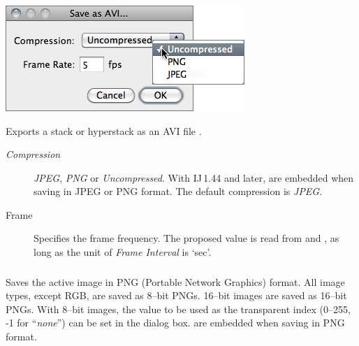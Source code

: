 \subsubsection{\protect{}\label{sub:SaveAs>Avi...}}

\begin{minipage}[c][1\totalheight][t]{0.47\columnwidth}%
\includegraphics[scale=0.55]{images/SaveAsAvi}%
\end{minipage}%
\begin{minipage}[c][1\totalheight][t]{0.53\columnwidth}%
Exports a stack or hyperstack as an AVI
file \cite{C-AviPlugins}.
\begin{description}
\item [{\emph{Compression}}] \emph{JPEG}, \emph{PNG} or \emph{Uncompressed}.
With IJ\,1.44 and later,  are embedded
when saving in JPEG or PNG format. The default compression is \emph{JPEG}. \end{description}
%
\end{minipage}
\begin{description}
\item [{Frame}] Specifies the frame frequency. The proposed value is read
from 
and ,
as long as the unit of \emph{Frame Interval} is `sec'.
\end{description}



\subsubsection{\protect{}\label{sub:PNG...}}

Saves the active image in PNG (Portable Network Graphics)
format. All image types, except RGB, are saved as 8--bit PNGs. 16--bit
images are saved as 16--bit PNGs. With 8--bit images, the value to
be used as the transparent index (0--255, -1 for ``\emph{none}'')
can be set in the 
dialog box.  are embedded when saving
in PNG format. 


